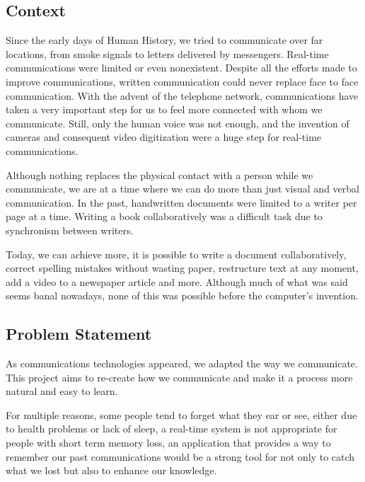 \subsection{Context}   %
Since the early days of Human History, we tried to communicate over far locations, from smoke signals to letters delivered by messengers. Real-time communications were limited or even nonexistent. Despite all the efforts made to improve communications, written communication could never replace face to face communication.
	With the advent of the telephone network, communications have taken a very important step for us to feel more connected with whom we communicate. Still, only the human voice was not enough, and the invention of cameras and consequent video digitization were a huge step for real-time communications.

 	Although nothing replaces the physical contact with a person while we communicate, we are at a time where we can do more than just  visual and verbal communication.
	In the past, handwritten documents were limited to a writer per page at a time. Writing a book collaboratively was a difficult task due to synchronism between writers.

	Today, we can achieve more, it is possible to write a document collaboratively, correct spelling mistakes without wasting paper, restructure text at any moment, add a video to a newspaper article and more. Although much of what was said seems banal nowadays, none of this was possible before the computer's invention. 

\subsection{Problem Statement} %

	As communications technologies appeared, we adapted the way we communicate. This project aims to re-create how we communicate and make it a process more natural and easy to learn. 
        
	For multiple reasons, some people tend to forget what they ear or see, either due to health problems or lack of sleep,
        a real-time system is not appropriate for people with short term memory loss, an application that provides a way to remember our past communications would be a strong tool for not only to catch what we lost but also to enhance our knowledge.


